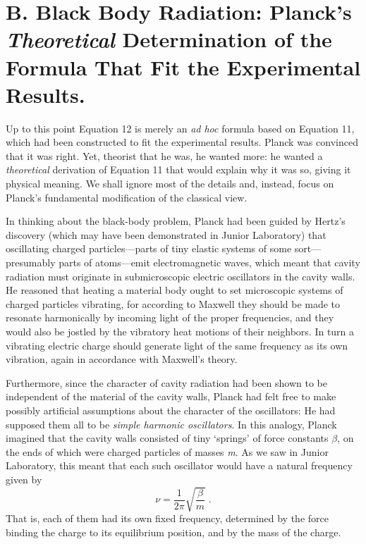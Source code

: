\vspace{5pt}

\section*{B. Black Body Radiation: Planck's \emph{Theoretical}
Determination of the Formula That Fit the Experimental Results.}

Up to this point Equation 12 is merely an \emph{ad hoc} formula based on
Equation 11, which had been constructed to fit the experimental results.
Planck was convinced that it was right. Yet, theorist that he was, he
wanted more: he wanted a \emph{theoretical} derivation of Equation 11
that would explain why it was so, giving it physical meaning. We shall
ignore most of the details and, instead, focus on Planck's fundamental
modification of the classical view.

In thinking about the black-body problem, Planck had been guided by
Hertz's discovery (which may have been demonstrated in Junior
Laboratory) that oscillating charged particles---parts of tiny elastic
systems of some sort---presumably parts of atoms---emit electromagnetic
waves, which meant that cavity radiation must originate in
submicroscopic electric oscillators in the cavity walls. He reasoned
that heating a material body ought to set microscopic systems of charged
particles vibrating, for according to Maxwell they should be made to
resonate harmonically by incoming light of the proper frequencies, and
they would also be jostled by the vibratory heat motions of their
neighbors. In turn a vibrating electric charge should generate light of
the same frequency as its own vibration, again in accordance with
Maxwell's theory.

Furthermore, since the character of cavity radiation had been shown to
be independent of the material of the cavity walls, Planck had felt free
to make possibly artificial assumptions about the character of the
oscillators: He had supposed them all to be \emph{simple harmonic
oscillators}. In this analogy, Planck imagined that the cavity walls
consisted of tiny `springs' of force constants $\beta$, on the ends of
which were charged particles of masses \emph{m}. As we saw in Junior
Laboratory, this meant that each such oscillator would have a natural
frequency given by
\begin{equation}
\nu = \frac{1}{2\pi}\sqrt{\frac{\beta}{m}} \; . %
\end{equation}
That is, each of them had its own fixed frequency, determined by the
force binding the charge to its equilibrium position, and by the mass of
the charge.

